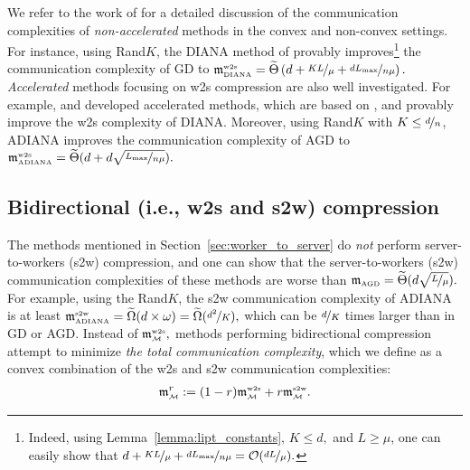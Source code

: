 \documentclass{article} %
\newcommand{\cM}{\mathcal{M}}
\newcommand{\cO}{\mathcal{O}}
\theoremstyle{plain}
\theoremstyle{definition}
\theoremstyle{remark}
\newcommand{\eqdef}{:=}
\newcommand{\green}{\color{mydarkgreen}}
\newcommand{\algname}[1]{{\small\green\sf #1}}
\begin{document}
We refer to the work of \citet{gruntkowska2022ef21} for a detailed discussion of the communication complexities of {\em non-accelerated} methods in the convex and non-convex settings. For instance, using  Rand$K$, the \algname{DIANA} method of \citet{DIANA} provably improves\footnote{Indeed, using Lemma~\ref{lemma:lipt_constants}, $K \leq d,$ and $L \geq \mu$, one can easily show that $d + \nicefrac{K L}{\mu} + \nicefrac{d L_{\max}}{n \mu} = \cO(\nicefrac{d L}{\mu}).$} the communication complexity of \algname{GD} to $\mathfrak{m}^{{\scriptscriptstyle \textnormal{w2s}}}_{{\scriptscriptstyle \textnormal{DIANA}}} = \widetilde{\Theta}\left(d + \nicefrac{K L}{\mu} + \nicefrac{d L_{\max}}{n \mu}\right).$ {\em Accelerated} methods focusing on w2s compression are also well investigated. For example, \citet{ADIANA} and \citet{li2021canita} developed accelerated methods, which are based on \citep{DIANA, kovalev2020don}, and provably improve the w2s complexity of \algname{DIANA}. Moreover, using Rand$K$  with $K \leq \nicefrac{d}{n}$, \algname{ADIANA} improves the communication complexity of \algname{AGD} to $\mathfrak{m}^{{\scriptscriptstyle \textnormal{w2s}}}_{{\scriptscriptstyle \textnormal{ADIANA}}} = \widetilde{\Theta}(d + d\sqrt{\nicefrac{L_{\max}}{n \mu}}).$

\subsection{Bidirectional  (i.e., w2s and s2w) compression}

The methods mentioned in Section~\ref{sec:worker_to_server} do {\em not} perform server-to-workers (s2w) compression, and one can show that the server-to-workers (s2w) communication complexities of these methods are worse than $\mathfrak{m}_{{\scriptscriptstyle \textnormal{AGD}}} = \widetilde{\Theta}(d \sqrt{\nicefrac{L}{\mu}}).$ For example, using the Rand$K$, the s2w communication complexity of \algname{ADIANA} is at least $\mathfrak{m}^{{\scriptscriptstyle \textnormal{s2w}}}_{{\scriptscriptstyle \textnormal{ADIANA}}} = \widetilde{\Omega}(d \times \omega) = \widetilde{\Omega}(\nicefrac{d^2}{K}),$ which can be $\nicefrac{d}{K}$ times larger than in \algname{GD} or \algname{AGD}.  Instead of $\mathfrak{m}^{{\scriptscriptstyle \textnormal{w2s}}}_{{\scriptscriptstyle \cM}},$ methods performing bidirectional compression attempt to minimize \emph{the total communication complexity}, which we define as a convex combination of the w2s and s2w communication complexities:
\begin{align}
  \label{eq:main_complexity}
  \mathfrak{m}^{r}_{{\scriptscriptstyle \cM}} \eqdef (1 - r)\mathfrak{m}^{{\scriptscriptstyle \textnormal{w2s}}}_{{\scriptscriptstyle \cM}} + r \mathfrak{m}^{{\scriptscriptstyle \textnormal{s2w}}}_{{\scriptscriptstyle \cM}}.
\end{align}
\end{document}

